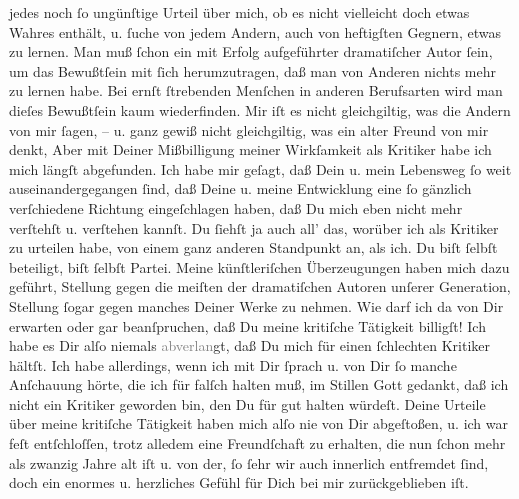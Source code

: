 \begin{ledgroupsized}[t]{13cm}
               jedes noch ſo ungünſtige Urteil über mich, ob es nicht vielleicht doch etwas Wahres
               enthält, u. ſuche von jedem Andern, auch von heftigſten Gegnern, etwas zu lernen. Man
               muß ſchon ein mit Erfolg aufgeführter dramatiſcher Autor ſein, {\pb}um das Bewußtſein mit ſich herumzutragen, daß
               man von Anderen nichts mehr zu lernen habe. Bei ernſt ſtrebenden Menſchen in anderen
               Berufsarten wird man dieſes Bewußtſein kaum wiederfinden.\pend
           \pstart
           Mir iſt es nicht gleichgiltig, was die Andern von mir ſagen, – u. ganz gewiß nicht
               gleichgiltig, was ein alter Freund von mir denkt, Aber mit Deiner Mißbilligung meiner
               Wirkſamkeit als Kritiker habe ich mich \introOben{}längſt\introOben{} abgefunden.
               Ich habe mir geſagt, daß Dein u. mein Lebensweg ſo
               weit auseinandergegangen ſind, {\pb}daß Deine u. meine
               Entwicklung eine ſo gänzlich verſchiedene Richtung eingeſchlagen haben, daß Du mich
               eben nicht mehr verſtehſt u. verſtehen kannſt. Du ſiehſt ja auch all’ das, worüber
               ich als Kritiker zu urteilen habe, von einem ganz anderen Standpunkt an, als ich. Du
               biſt ſelbſt beteiligt, biſt ſelbſt Partei. Meine künſtleriſchen Überzeugungen haben
               mich dazu geführt, Stellung gegen  die meiſten der dramatiſchen Autoren unſerer Generation, Stellung ſogar gegen
               manches Deiner Werke zu nehmen. {\pb}Wie darf ich da
               von Dir erwarten oder gar beanſpruchen, daß Du meine kritiſche Tätigkeit
               billigſt!\pend
           \pstart
           Ich habe es Dir alſo niemals \textcolor{gray}{abverlan}gt, daß Du mich für einen
               ſchlechten Kritiker hältſt. Ich habe allerdings, wenn ich mit Dir ſprach u. von Dir
               ſo manche Anſchauung hörte, die ich für falſch halten muß, im Stillen Gott gedankt,
               daß ich nicht ein Kritiker geworden bin, den Du für gut halten würdeſt.\pend
           \pstart
           {\pb}Deine Urteile über meine kritiſche Tätigkeit
               haben mich alſo nie von Dir abgeſtoßen, u. ich war feſt entſchloſſen, trotz alledem
                  \strikeout{\textcolor{gray}{Dir}} eine Freundſchaft zu erhalten, die nun ſchon mehr als zwanzig Jahre alt
                  iſt\strikeout{,} u. von der, ſo ſehr wir auch innerlich
               entfremdet ſind, doch ein enormes u. herzliches Gefühl für Dich bei mir
               zurückgeblieben iſt.\strikeout{\textcolor{gray}{×}}\pend

\end{ledgroupsized}
